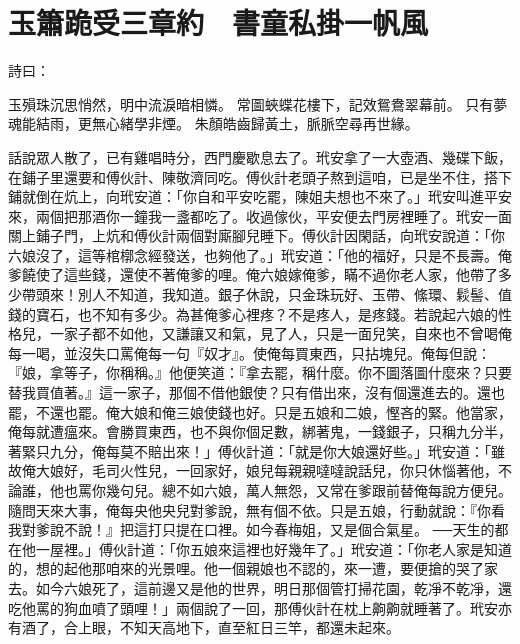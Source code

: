 %

\chapter{玉簫跪受三章約　書童私掛一帆風}

詩曰：

玉殞珠沉思悄然，明中流淚暗相憐。
常圖蛺蝶花樓下，記效鴛鴦翠幕前。
只有夢魂能結雨，更無心緒學非煙。
朱顏皓齒歸黃土，脈脈空尋再世緣。

話說眾人散了，已有雞唱時分，西門慶歇息去了。玳安拿了一大壺酒、幾碟下飯，在鋪子里還要和傅伙計、陳敬濟同吃。傅伙計老頭子熬到這咱，已是坐不住，搭下鋪就倒在炕上，向玳安道：「你自和平安吃罷，陳姐夫想也不來了。」玳安叫進平安來，兩個把那酒你一鐘我一盞都吃了。收過傢伙，平安便去門房裡睡了。玳安一面關上鋪子門，上炕和傅伙計兩個對廝腳兒睡下。傅伙計因閑話，向玳安說道：「你六娘沒了，這等棺槨念經發送，也夠他了。」玳安道：「他的福好，只是不長壽。俺爹饒使了這些錢，還使不著俺爹的哩。俺六娘嫁俺爹，瞞不過你老人家，他帶了多少帶頭來！別人不知道，我知道。銀子休說，只金珠玩好、玉帶、絛環、鬏髻、值錢的寶石，也不知有多少。為甚俺爹心裡疼？不是疼人，是疼錢。若說起六娘的性格兒，一家子都不如他，又謙讓又和氣，見了人，只是一面兒笑，自來也不曾喝俺每一喝，並沒失口罵俺每一句『奴才』。使俺每買東西，只拈塊兒。俺每但說：『娘，拿等子，你稱稱。』他便笑道：『拿去罷，稱什麼。你不圖落圖什麼來？只要替我買值著。』這一家子，那個不借他銀使？只有借出來，沒有個還進去的。還也罷，不還也罷。俺大娘和俺三娘使錢也好。只是五娘和二娘，慳吝的緊。他當家，俺每就遭瘟來。會勝買東西，也不與你個足數，綁著鬼，一錢銀子，只稱九分半，著緊只九分，俺每莫不賠出來！」傅伙計道：「就是你大娘還好些。」玳安道：「雖故俺大娘好，毛司火性兒，一回家好，娘兒每親親噠噠說話兒，你只休惱著他，不論誰，他也罵你幾句兒。總不如六娘，萬人無怨，又常在爹跟前替俺每說方便兒。隨問天來大事，俺每央他央兒對爹說，無有個不依。只是五娘，行動就說：『你看我對爹說不說！』把這打只提在口裡。如今春梅姐，又是個合氣星。 ──天生的都在他一屋裡。」傅伙計道：「你五娘來這裡也好幾年了。」玳安道：「你老人家是知道的，想的起他那咱來的光景哩。他一個親娘也不認的，來一遭，要便搶的哭了家去。如今六娘死了，這前邊又是他的世界，明日那個管打掃花園，乾凈不乾凈，還吃他罵的狗血噴了頭哩！」兩個說了一回，那傅伙計在枕上齁齁就睡著了。玳安亦有酒了，合上眼，不知天高地下，直至紅日三竿，都還未起來。

